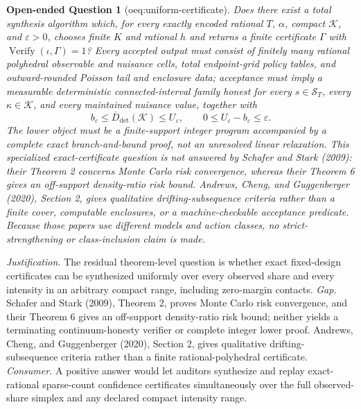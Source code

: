 \documentclass{article}
\newtheorem{openendedquestion}{Open-ended Question}
\begin{document}
\begin{openendedquestion}[oeq:uniform-certificate]\label{oeq:uniform-certificate}
Does there exist a total synthesis algorithm which, for every exactly encoded rational \(T\), \(\alpha\), compact \(\mathcal K\), and \(\varepsilon>0\), chooses finite \(K\) and rational \(h\) and returns a finite certificate \(\Gamma\) with \(\operatorname{Verify}(\iota,\Gamma)=1\)? Every accepted output must consist of finitely many rational polyhedral observable and nuisance cells, total endpoint-grid policy tables, and outward-rounded Poisson tail and enclosure data; acceptance must imply a measurable deterministic connected-interval family honest for every \(s\in\mathcal S_T\), every \(\kappa\in\mathcal K\), and every maintained nuisance value, together with
\[
 b_\varepsilon\le\overline D_{\mathrm{det}}(\mathcal K)\le U_\varepsilon,
 \qquad 0\le U_\varepsilon-b_\varepsilon\le\varepsilon.
\]
The lower object must be a finite-support integer program accompanied by a complete exact branch-and-bound proof, not an unresolved linear relaxation. This specialized exact-certificate question is not answered by Schafer and Stark (2009): their Theorem 2 concerns Monte Carlo risk convergence, whereas their Theorem 6 gives an off-support density-ratio risk bound. Andrews, Cheng, and Guggenberger (2020), Section 2, gives qualitative drifting-subsequence criteria rather than a finite cover, computable enclosures, or a machine-checkable acceptance predicate. Because those papers use different models and action classes, no strict-strengthening or class-inclusion claim is made.
\end{openendedquestion}
\par\smallskip\noindent \textit{Justification.} The residual theorem-level question is whether exact fixed-design certificates can be synthesized uniformly over every observed share and every intensity in an arbitrary compact range, including zero-margin contacts. \textit{Gap.} Schafer and Stark (2009), Theorem 2, proves Monte Carlo risk convergence, and their Theorem 6 gives an off-support density-ratio risk bound; neither yields a terminating continuum-honesty verifier or complete integer lower proof. Andrews, Cheng, and Guggenberger (2020), Section 2, gives qualitative drifting-subsequence criteria rather than a finite rational-polyhedral certificate. \textit{Consumer.} A positive answer would let auditors synthesize and replay exact-rational sparse-count confidence certificates simultaneously over the full observed-share simplex and any declared compact intensity range.
\end{document}
